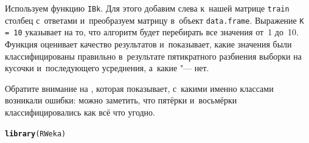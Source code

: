 \documentclass[final,pdftex]{../../template/epsilonj}\usepackage[]{graphicx}\usepackage[]{color}
\makeatletter
\newcommand{\hlstd}[1]{\textcolor[rgb]{0.345,0.345,0.345}{#1}}%
\newcommand{\hlkwd}[1]{\textcolor[rgb]{0.737,0.353,0.396}{\textbf{#1}}}%
\newenvironment{kframe}{%
 \def\at@end@of@kframe{}%
 \ifinner\ifhmode%
  \def\at@end@of@kframe{\end{minipage}}%
  \begin{minipage}{\columnwidth}%
 \fi\fi%
 \def\FrameCommand##1{\hskip\@totalleftmargin \hskip-\fboxsep
 \colorbox{shadecolor}{##1}\hskip-\fboxsep
     \hskip-\linewidth \hskip-\@totalleftmargin \hskip\columnwidth}%
 \MakeFramed {\advance\hsize-\width
   \@totalleftmargin\z@ \linewidth\hsize
   \@setminipage}}%
 {\par\unskip\endMakeFramed%
 \at@end@of@kframe}
\newenvironment{knitrout}{}{} %
\makeatother
\begin{document}
Используем функцию \texttt{IBk}. 
Для этого добавим слева к~нашей матрице \texttt{train} столбец с~ответами и~преобразуем матрицу в~объект \texttt{data.frame}. 
Выражение \texttt{K = 10} указывает на то, что алгоритм будет перебирать все значения от~1 до~10. 
Функция  оценивает качество результатов и~показывает, какие значения были классифицированы правильно в~результате пятикратного разбиения выборки на кусочки и~последующего усреднения, а~какие "--- нет. 

Обратите внимание на , которая показывает, с~какими именно классами возникали ошибки: можно заметить, что пятёрки и~восьмёрки классифицировались как всё что угодно.

\begin{knitrout}
\color{fgcolor}\begin{kframe}
\begin{alltt}
\hlkwd{library}\hlstd{(RWeka)}


\end{alltt}
\end{kframe}
\end{knitrout}
\end{document}

